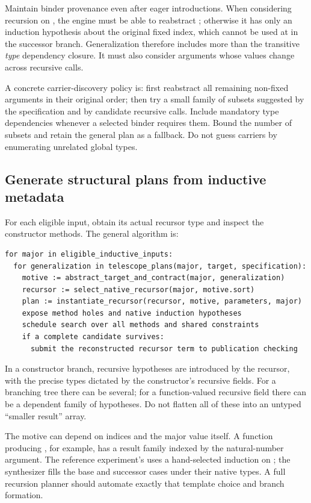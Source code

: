 Maintain binder provenance even after eager introductions. When considering recursion on , the engine must be able to reabstract ; otherwise it has only an induction hypothesis about the original fixed index, which cannot be used at  in the successor branch. Generalization therefore includes more than the transitive \emph{type} dependency closure. It must also consider arguments whose values change across recursive calls.

A concrete carrier-discovery policy is: first reabstract all remaining non-fixed arguments in their original order; then try a small family of subsets suggested by the specification and by candidate recursive calls. Include mandatory type dependencies whenever a selected binder requires them. Bound the number of subsets and retain the general plan as a fallback. Do not guess carriers by enumerating unrelated global types.

\subsection{Generate structural plans from inductive metadata}
For each eligible input, obtain its actual recursor type and inspect the constructor methods. The general algorithm is:
\begin{lstlisting}[language={},caption={Structural-plan generation. All method holes retain their native dependent types.}]
for major in eligible_inductive_inputs:
  for generalization in telescope_plans(major, target, specification):
    motive := abstract_target_and_contract(major, generalization)
    recursor := select_native_recursor(major, motive.sort)
    plan := instantiate_recursor(recursor, motive, parameters, major)
    expose method holes and native induction hypotheses
    schedule search over all methods and shared constraints
    if a complete candidate survives:
      submit the reconstructed recursor term to publication checking
\end{lstlisting}
In a constructor branch, recursive hypotheses are introduced by the recursor, with the precise types dictated by the constructor's recursive fields. For a branching tree there can be several; for a function-valued recursive field there can be a dependent family of hypotheses. Do not flatten all of these into an untyped ``smaller result'' array.

The motive can depend on indices and the major value itself. A function producing , for example, has a result family indexed by the natural-number argument. The reference experiment's  uses a hand-selected induction on ; the synthesizer fills the base and successor cases under their native types. A full recursion planner should automate exactly that template choice and branch formation.

